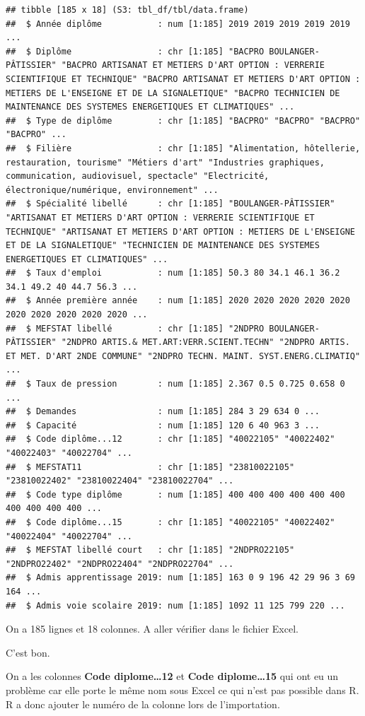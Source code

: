 \documentclass[
]{book}
\begin{document}
\begin{verbatim}
## tibble [185 x 18] (S3: tbl_df/tbl/data.frame)
##  $ Année diplôme           : num [1:185] 2019 2019 2019 2019 2019 ...
##  $ Diplôme                 : chr [1:185] "BACPRO BOULANGER-PÂTISSIER" "BACPRO ARTISANAT ET METIERS D'ART OPTION : VERRERIE SCIENTIFIQUE ET TECHNIQUE" "BACPRO ARTISANAT ET METIERS D'ART OPTION : METIERS DE L'ENSEIGNE ET DE LA SIGNALETIQUE" "BACPRO TECHNICIEN DE MAINTENANCE DES SYSTEMES ENERGETIQUES ET CLIMATIQUES" ...
##  $ Type de diplôme         : chr [1:185] "BACPRO" "BACPRO" "BACPRO" "BACPRO" ...
##  $ Filière                 : chr [1:185] "Alimentation, hôtellerie, restauration, tourisme" "Métiers d'art" "Industries graphiques, communication, audiovisuel, spectacle" "Electricité, électronique/numérique, environnement" ...
##  $ Spécialité libellé      : chr [1:185] "BOULANGER-PÂTISSIER" "ARTISANAT ET METIERS D'ART OPTION : VERRERIE SCIENTIFIQUE ET TECHNIQUE" "ARTISANAT ET METIERS D'ART OPTION : METIERS DE L'ENSEIGNE ET DE LA SIGNALETIQUE" "TECHNICIEN DE MAINTENANCE DES SYSTEMES ENERGETIQUES ET CLIMATIQUES" ...
##  $ Taux d'emploi           : num [1:185] 50.3 80 34.1 46.1 36.2 34.1 49.2 40 44.7 56.3 ...
##  $ Année première année    : num [1:185] 2020 2020 2020 2020 2020 2020 2020 2020 2020 2020 ...
##  $ MEFSTAT libellé         : chr [1:185] "2NDPRO BOULANGER-PÂTISSIER" "2NDPRO ARTIS.& MET.ART:VERR.SCIENT.TECHN" "2NDPRO ARTIS. ET MET. D'ART 2NDE COMMUNE" "2NDPRO TECHN. MAINT. SYST.ENERG.CLIMATIQ" ...
##  $ Taux de pression        : num [1:185] 2.367 0.5 0.725 0.658 0 ...
##  $ Demandes                : num [1:185] 284 3 29 634 0 ...
##  $ Capacité                : num [1:185] 120 6 40 963 3 ...
##  $ Code diplôme...12       : chr [1:185] "40022105" "40022402" "40022403" "40022704" ...
##  $ MEFSTAT11               : chr [1:185] "23810022105" "23810022402" "23810022404" "23810022704" ...
##  $ Code type diplôme       : num [1:185] 400 400 400 400 400 400 400 400 400 400 ...
##  $ Code diplôme...15       : chr [1:185] "40022105" "40022402" "40022404" "40022704" ...
##  $ MEFSTAT libellé court   : chr [1:185] "2NDPRO22105" "2NDPRO22402" "2NDPRO22404" "2NDPRO22704" ...
##  $ Admis apprentissage 2019: num [1:185] 163 0 9 196 42 29 96 3 69 164 ...
##  $ Admis voie scolaire 2019: num [1:185] 1092 11 125 799 220 ...
\end{verbatim}

On a 185 lignes et 18 colonnes. A aller vérifier dans le fichier Excel.

C'est bon.

On a les colonnes \textbf{Code diplome\ldots12} et \textbf{Code diplome\ldots15} qui ont eu
un problème car elle porte le même nom sous Excel ce qui n'est pas possible dans R.
R a donc ajouter le numéro de la colonne lors de l'importation.
\end{document}
